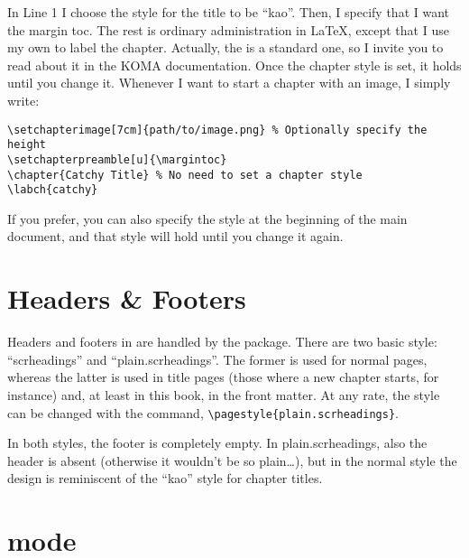 In Line 1 I choose the style for the title to be \enquote{kao}. Then, I 
specify that I want the margin toc. The rest is ordinary administration 
in \LaTeX, except that I use my own  to label the 
chapter. Actually, the  is a standard 
\KOMAScript\xspace one, so I invite you to read about it in the KOMA
documentation. Once the chapter style is set, it holds until you change 
it. Whenever I want to start a chapter with an image, 
I simply write:

\begin{lstlisting}
\setchapterimage[7cm]{path/to/image.png} % Optionally specify the height
\setchapterpreamble[u]{\margintoc}
\chapter{Catchy Title} % No need to set a chapter style
\labch{catchy}
\end{lstlisting}

If you prefer, you can also specify the style at the beginning of the 
main document, and that style will hold until you change it again.

\section{Headers \& Footers}

Headers and footers in \KOMAScript\xspace are handled by the 
 package. There are two basic style: 
\enquote{scrheadings} and \enquote{plain.scrheadings}. The former is 
used for normal pages, whereas the latter is used in title pages (those 
where a new chapter starts, for instance) and, at least in this book, in 
the front matter. At any rate, the style can be changed with the 
 command, \eg 
\lstinline|\pagestyle{plain.scrheadings}|.

In both styles, the footer is completely empty. In plain.scrheadings,
also the header is absent (otherwise it wouldn't be so plain\ldots), but 
in the normal style the design is reminiscent of the \enquote{kao} style
for chapter titles.

\section{ mode}

